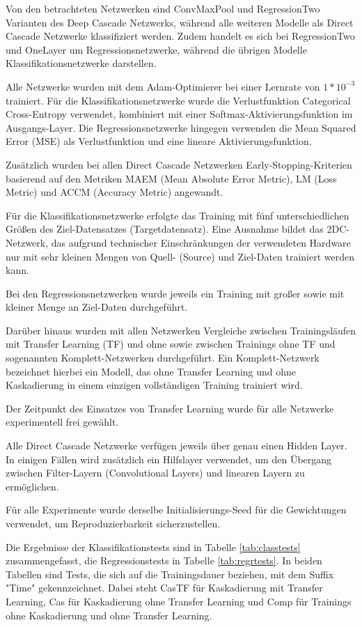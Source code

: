 Von den betrachteten Netzwerken sind ConvMaxPool und RegressionTwo Varianten des Deep Cascade Netzwerks, während alle weiteren Modelle als 
Direct Cascade Netzwerke klassifiziert werden. Zudem handelt es sich bei RegressionTwo und OneLayer um Regressionsnetzwerke, während die übrigen 
Modelle Klassifikationsnetzwerke darstellen.

Alle Netzwerke wurden mit dem Adam-Optimierer bei einer Lernrate von $1*10^{-3}$ trainiert. Für die Klassifikationsnetzwerke wurde die 
Verlustfunktion Categorical Cross-Entropy verwendet, kombiniert mit einer Softmax-Aktivierungsfunktion im Ausgangs-Layer. Die 
Regressionsnetzwerke hingegen verwenden die Mean Squared Error (MSE) als Verlustfunktion und eine lineare Aktivierungsfunktion.

Zusätzlich wurden bei allen Direct Cascade Netzwerken Early-Stopping-Kriterien basierend auf den Metriken MAEM (Mean Absolute Error Metric), 
LM (Loss Metric) und ACCM (Accuracy Metric) angewandt.

Für die Klassifikationsnetzwerke erfolgte das Training mit fünf unterschiedlichen Größen des Ziel-Datensatzes (Targetdatensatz). Eine 
Ausnahme bildet das 2DC-Netzwerk, das aufgrund technischer Einschränkungen der verwendeten Hardware nur mit sehr kleinen Mengen von Quell- 
(Source) und Ziel-Daten trainiert werden kann.

Bei den Regressionsnetzwerken wurde jeweils ein Training mit großer sowie mit kleiner Menge an Ziel-Daten durchgeführt.

Darüber hinaus wurden mit allen Netzwerken Vergleiche zwischen Trainingsläufen mit Transfer Learning (TF) und ohne sowie zwischen Trainings 
ohne TF und sogenannten Komplett-Netzwerken durchgeführt. Ein Komplett-Netzwerk bezeichnet hierbei ein Modell, das ohne Transfer Learning und 
ohne Kaskadierung in einem einzigen vollständigen Training trainiert wird.

Der Zeitpunkt des Einsatzes von Transfer Learning wurde für alle Netzwerke experimentell frei gewählt.

Alle Direct Cascade Netzwerke verfügen jeweils über genau einen Hidden Layer. In einigen Fällen wird zusätzlich ein Hilfslayer verwendet, um 
den Übergang zwischen Filter-Layern (Convolutional Layers) und linearen Layern zu ermöglichen.

Für alle Experimente wurde derselbe Initialisierungs-Seed für die Gewichtungen verwendet, um Reproduzierbarkeit sicherzustellen.

Die Ergebnisse der Klassifikationstests sind in Tabelle \ref{tab:classtests} zusammengefasst, die Regressionstests in Tabelle \ref{tab:regrtests}. 
In beiden Tabellen sind Tests, die sich auf die Trainingsdauer beziehen, mit dem Suffix "Time" gekennzeichnet. Dabei steht CasTF für Kaskadierung 
mit Transfer Learning, Cas für Kaskadierung ohne Transfer Learning und Comp für Trainings ohne Kaskadierung und ohne Transfer Learning.

